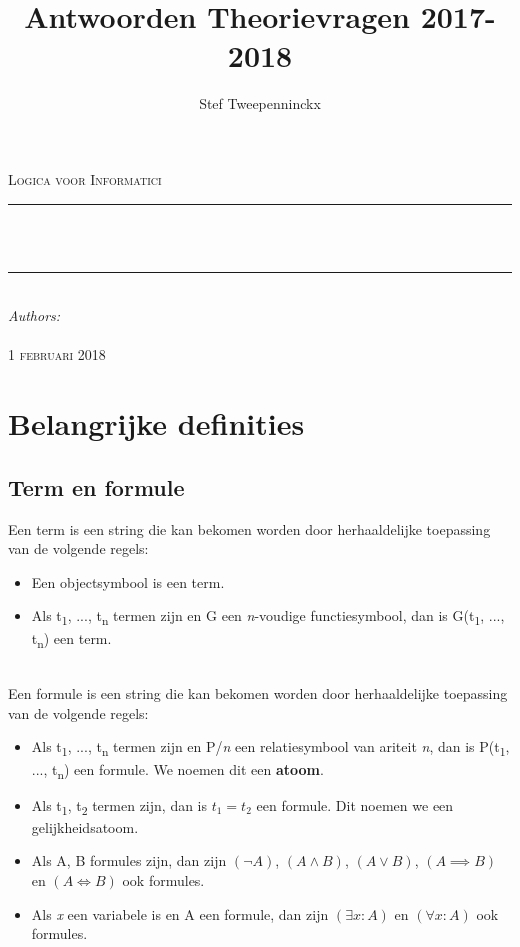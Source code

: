 \documentclass[11pt, a4paper]{article}
\author{Stef Tweepenninckx}
\title{Antwoorden Theorievragen 2017-2018}
\makeatletter
\def\printtitle{                 
    {\large \@title}}
\def\printauthor{                  
    {\large \@author}}
\makeatother
\begin{document}
\begin{titlepage}
\newcommand{\HRule}{\rule{\linewidth}{0.5mm}} 
\center 
\textsc{\LARGE Logica voor Informatici}\\[1.5cm] 
\HRule \\[0.4cm]

{\huge \bfseries \printtitle}\\[0.4cm] 
\HRule \\[0.4cm]

\Large \emph{Authors:}\\
 \textsc{\printauthor}\\[3cm]

{\large \textsc{1 februari 2018}}\\[3cm] 

\vfill 
\end{titlepage}
\tableofcontents
\newpage
{}
\section*{Belangrijke definities}
\subsection*{Term en formule}
Een term is een string die kan bekomen worden door herhaaldelijke toepassing van de volgende regels: \begin{itemize}
\item Een objectsymbool is een term.
\item Als t\textsubscript{1}, ..., t\textsubscript{n} termen zijn en G een \textit{n}-voudige functiesymbool, dan is G(t\textsubscript{1}, ..., t\textsubscript{n}) een term.
\end{itemize} \hspace{0pt}\\
Een formule is een string die kan bekomen worden door herhaaldelijke toepassing van de volgende regels: \begin{itemize}
\item Als t\textsubscript{1}, ..., t\textsubscript{n} termen zijn en P/\textit{n} een relatiesymbool van ariteit \textit{n}, dan is P(t\textsubscript{1}, ..., t\textsubscript{n}) een formule. We noemen dit een \textbf{atoom}.
\item Als t\textsubscript{1}, t\textsubscript{2} termen zijn, dan is $t_1 = t_2$ een formule. Dit noemen we een gelijkheidsatoom.
\item Als A, B formules zijn, dan zijn $(\neg A)$, $(A\land B)$, $(A\lor B)$, $(A\implies B)$ en $(A\iff B)$ ook formules.
\item Als \textit{x} een variabele is en A een formule, dan zijn $(\exists x: A)$ en $(\forall x: A) $ ook formules.
\end{itemize}
\end{document}
